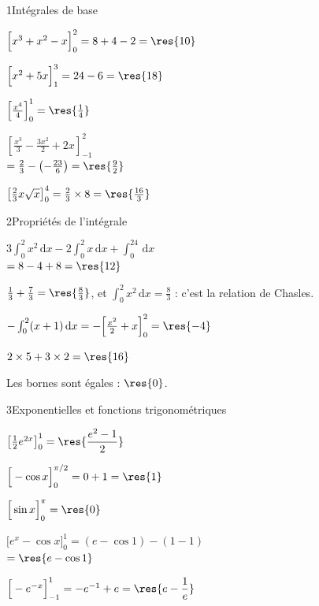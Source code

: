 

\begin{deuxcolonnes}

\begin{corrige}{1}{Intégrales de base}
\begin{questions}
  \item $\Big[x^{3}+x^{2}-x\Big]_0^2=8+4-2=\res{10}$
  \item $\Big[x^{2}+5x\Big]_1^3=24-6=\res{18}$
  \item $\left[\frac{x^{4}}{4}\right]_0^1=\res{\frac14}$
  \item $\left[\frac{x^{3}}{3}-\frac{3x^{2}}{2}+2x\right]_{-1}^2$\\ $=\frac23-\left(-\frac{23}{6}\right)=\res{\frac92}$
  \item $\left[\frac23x\sqrt x\right]_0^4=\frac23\times8=\res{\frac{16}{3}}$
\end{questions}
\end{corrige}

\begin{corrige}{2}{Propriétés de l'intégrale}
\begin{questions}
  \item $3\int_0^2x^{2}\,\mathrm{d}x-2\int_0^2x\,\mathrm{d}x+\int_0^24\,\mathrm{d}x$\\ $=8-4+8=\res{12}$
  \item $\frac13+\frac73=\res{\frac83}$, et $\int_0^2x^{2}\,\mathrm{d}x=\frac83$ : c'est la relation de Chasles.
  \item $-\int_0^2(x+1)\,\mathrm{d}x=-\Big[\frac{x^{2}}{2}+x\Big]_0^2=\res{-4}$
  \item $2\times5+3\times2=\res{16}$
  \item Les bornes sont égales : $\res{0}$.
\end{questions}
\end{corrige}

\begin{corrige}{3}{Exponentielles et fonctions trigonométriques}
\begin{questions}
  \item $\left[\frac12e^{2x}\right]_0^1=\res{\dfrac{e^{2}-1}{2}}$
  \item $\Big[-\cos x\Big]_0^{\pi/2}=0+1=\res{1}$
  \item $\Big[\sin x\Big]_0^{\pi}=\res{0}$
  \item $\Big[e^{x}-\cos x\Big]_0^1=(e-\cos1)-(1-1)$\\ $=\res{e-\cos1}$
  \item $\Big[-e^{-x}\Big]_{-1}^1=-e^{-1}+e=\res{e-\dfrac1e}$
\end{questions}
\end{corrige}


\end{deuxcolonnes}
